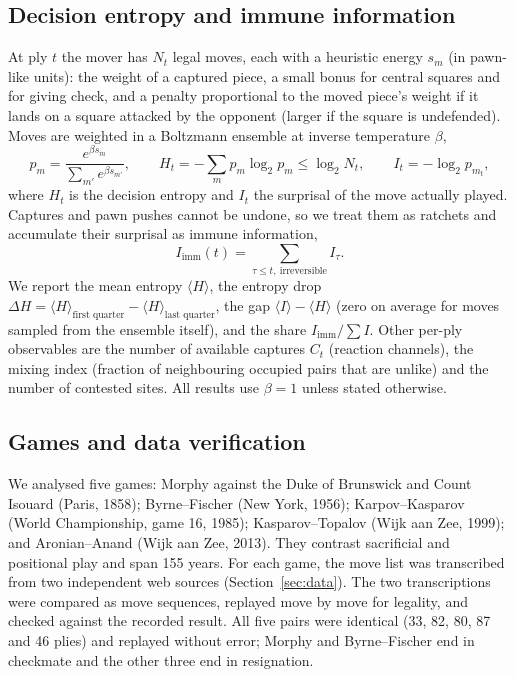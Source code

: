\documentclass[11pt,a4paper]{article}
\begin{document}
\subsection{Decision entropy and immune information}
At ply $t$ the mover has $N_t$ legal moves, each with a heuristic energy $s_m$ (in pawn-like units): the weight of a captured piece, a small bonus for central squares and for giving check, and a penalty proportional to the moved piece's weight if it lands on a square attacked by the opponent (larger if the square is undefended). Moves are weighted in a Boltzmann ensemble at inverse temperature $\beta$,
\begin{equation}
p_m=\frac{e^{\beta s_m}}{\sum_{m'}e^{\beta s_{m'}}},\qquad
H_t=-\sum_m p_m\log_2 p_m\le\log_2 N_t,\qquad
I_t=-\log_2 p_{m_t},
\end{equation}
where $H_t$ is the decision entropy and $I_t$ the surprisal of the move actually played. Captures and pawn pushes cannot be undone, so we treat them as ratchets and accumulate their surprisal as immune information,
\begin{equation}
I_{\mathrm{imm}}(t)=\sum_{\tau\le t,\ \text{irreversible}}I_\tau .
\end{equation}
We report the mean entropy $\langle H\rangle$, the entropy drop $\Delta H=\langle H\rangle_{\text{first quarter}}-\langle H\rangle_{\text{last quarter}}$, the gap $\langle I\rangle-\langle H\rangle$ (zero on average for moves sampled from the ensemble itself), and the share $I_{\mathrm{imm}}/\sum I$. Other per-ply observables are the number of available captures $C_t$ (reaction channels), the mixing index (fraction of neighbouring occupied pairs that are unlike) and the number of contested sites. All results use $\beta=1$ unless stated otherwise.

\subsection{Games and data verification}
We analysed five games: Morphy against the Duke of Brunswick and Count Isouard (Paris, 1858); Byrne--Fischer (New York, 1956); Karpov--Kasparov (World Championship, game 16, 1985); Kasparov--Topalov (Wijk aan Zee, 1999); and Aronian--Anand (Wijk aan Zee, 2013). They contrast sacrificial and positional play and span 155 years. For each game, the move list was transcribed from two independent web sources (Section~\ref{sec:data}). The two transcriptions were compared as move sequences, replayed move by move for legality, and checked against the recorded result. All five pairs were identical (33, 82, 80, 87 and 46 plies) and replayed without error; Morphy and Byrne--Fischer end in checkmate and the other three end in resignation.
\end{document}
